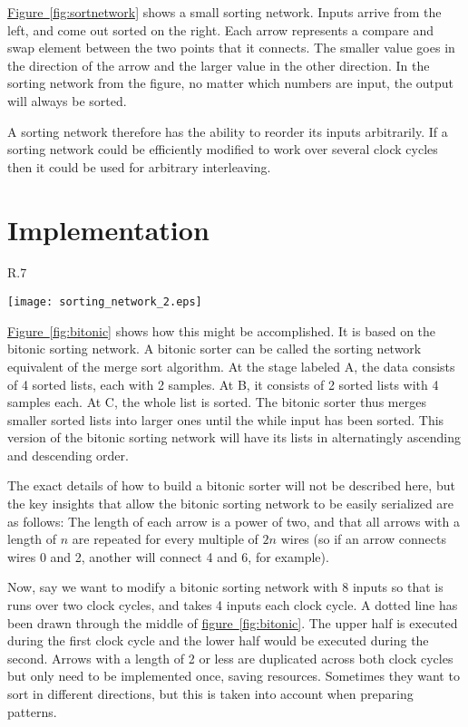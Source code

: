 \documentclass[
	utf8,
	largesmallcaps,
	intlimits,
	widermath,
	sharecounter,
	nobreak,
	definition=marks,
	numbers,
	noparts
]{rtthesis}
\newcommand{\figureref}[1]{\hyperref[#1]{figure~\ref*{#1}}}
\newcommand{\Figureref}[1]{\hyperref[#1]{Figure~\ref*{#1}}}
\begin{document}
\Figureref{fig:sortnetwork} shows a small sorting network. Inputs arrive
from the left, and come out sorted on the right. Each arrow represents a
compare and swap element between the two points that it connects. The smaller
value goes in the direction of the arrow and the larger value in the other
direction. In the sorting network from the figure, no matter which numbers are
input, the output will always be sorted.

A sorting network therefore has the ability to reorder its inputs arbitrarily.
If a sorting network could be efficiently modified to work over several clock
cycles then it could be used for arbitrary interleaving.

\section{Implementation}

\begin{wrapfigure}{R}{.7\textwidth}
\begin{center}
\texttt{[image: sorting\_network\_2.eps]}
\end{center}
\caption{
A bitonic sorting network with 8 inputs and how it might be converted to serial
operation.
}
\label{fig:bitonic}
\end{wrapfigure}

\Figureref{fig:bitonic} shows how this might be accomplished. It is based on
the bitonic sorting network. A bitonic sorter can be called the sorting network
equivalent of the merge sort algorithm. At the stage labeled A, the data
consists of 4 sorted lists, each with 2 samples. At B, it consists of 2 sorted
lists with 4 samples each. At C, the whole list is sorted. The bitonic sorter
thus merges smaller sorted lists into larger ones until the while input has
been sorted. This version of the bitonic sorting network will have its lists in
alternatingly ascending and descending order.

The exact details of how to build a bitonic sorter will not be described here,
but the key insights that allow the bitonic sorting network to be easily
serialized are as follows: The length of each arrow is a power of two, and that
all arrows with a length of $n$ are repeated for every multiple of $2n$ wires
(so if an arrow connects wires 0 and 2, another will connect 4 and 6, for
example).

Now, say we want to modify a bitonic sorting network with 8 inputs so that is
runs over two clock cycles, and takes 4 inputs each clock cycle. A dotted line
has been drawn through the middle of \figureref{fig:bitonic}. The upper half
is executed during the first clock cycle and the lower half would be executed
during the second. Arrows with a length of 2 or less are duplicated across both
clock cycles but only need to be implemented once, saving resources. Sometimes
they want to sort in different directions, but this is taken into account when
preparing patterns.
\end{document}
